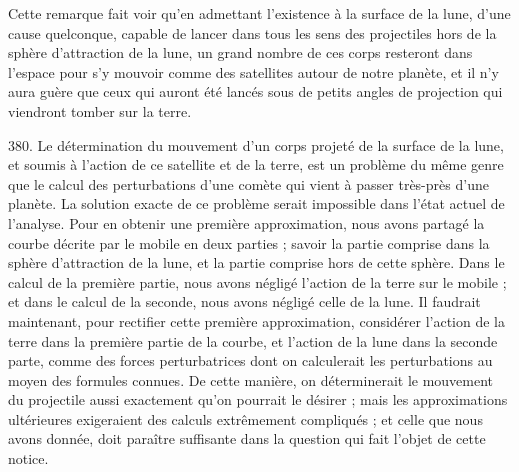 \documentclass[a4paper, 11pt, oneside, polutonikogreek, french]{article}
\begin{document}

Cette remarque fait voir qu'en admettant l'existence à la surface de la lune, d'une cause quelconque, capable de lancer dans tous les sens des projectiles hors de la sphère d'attraction de la lune, un grand nombre de ces corps resteront dans l'espace pour s'y mouvoir comme des satellites autour de notre planète, et il n'y aura guère que ceux qui auront été lancés sous de petits angles de projection qui viendront tomber sur la terre.

380. Le détermination du mouvement d'un corps projeté de la surface de la lune, et soumis à l'action de ce satellite et de la terre, est un problème du même genre que le calcul des perturbations d'une comète qui vient à passer très-près d'une planète. La solution exacte de ce problème serait impossible dans l'état actuel de l'analyse. Pour en obtenir une première approximation, nous avons partagé la courbe décrite par le mobile en deux parties ; savoir la partie comprise dans la sphère d'attraction de la lune, et la partie comprise hors de cette sphère. Dans le calcul de la première partie, nous avons négligé l'action de la terre sur le mobile ; et dans le calcul de la seconde, nous avons négligé celle de la lune. Il faudrait maintenant, pour rectifier cette première approximation, considérer l'action de la terre dans la première partie de la courbe, et l'action de la lune dans la seconde parte, comme des forces perturbatrices dont on calculerait les perturbations au moyen des formules connues. De cette manière, on déterminerait le mouvement du projectile aussi exactement qu'on pourrait le désirer ; mais les approximations ultérieures exigeraient des calculs extrêmement compliqués ; et celle que nous avons donnée, doit paraître suffisante dans la question qui fait l'objet de cette notice.
\end{document}
